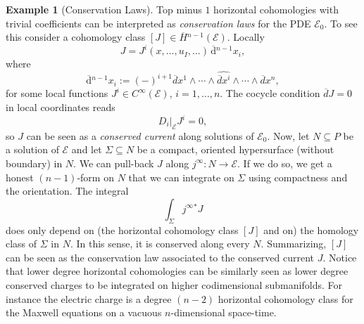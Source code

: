 \documentclass{conm-p-l}
\theoremstyle{definition}
\newtheorem{example}[theorem]{Example}
\theoremstyle{remark}
\numberwithin{equation}{section}
\begin{document}
\begin{example}[Conservation Laws]\label{exmpl:cons_law}
Top minus $1$ horizontal cohomologies with trivial coefficients can be interpreted as \emph{conservation laws} for the PDE $\mathscr E_0$. To see this consider a cohomology class $[J] \in \overline H{}^{n-1} (\mathscr E)$. Locally
\[
J = J^i (x, \ldots, u_I, \ldots)\, \overline{\mathrm{d}}{}^{n-1} x_i,
\]
where
\[
\overline{\mathrm{d}}{}^{n-1} x_i := (-)^{i+1}\overline d x^1 \wedge \cdots \wedge \widehat{\overline d x^i} \wedge \cdots \wedge \overline d x^n,
\]
for some local functions $J^i \in C^\infty (\mathscr E)$, $i = 1, \ldots, n$. The cocycle condition $\overline d J = 0$ in local coordinates reads
\[
D_i |_{\mathscr E} J^i = 0,
\]
so $J$ can be seen as a \emph{conserved current} along solutions of $\mathscr E_0$. Now, let $N \subseteq P$ be a solution of $\mathscr E$ and let $\Sigma \subseteq N$ be a compact, oriented hypersurface (without boundary) in $N$. We can pull-back $J$ along $j^\infty : N \to \mathscr E$. If we do so, we get a honest $(n-1)$-form on $N$ that we can integrate on $\Sigma$ using compactness and the orientation. The integral
\[
\int_\Sigma j^\infty{}^\ast J
\]
does only depend on (the horizontal cohomology class $[J]$ and on) the homology class of $\Sigma$ in $N$. In this sense, it is conserved along every $N$. Summarizing, $[J]$ can be seen as the conservation law associated to the conserved current $J$. Notice that lower degree horizontal cohomologies can be similarly seen as lower degree conserved charges to be integrated on higher codimensional submanifolds. For instance the electric charge is a degree $(n-2)$ horizontal cohomology class for the Maxwell equations on a vacuous $n$-dimensional space-time.
\end{example}
\end{document}
